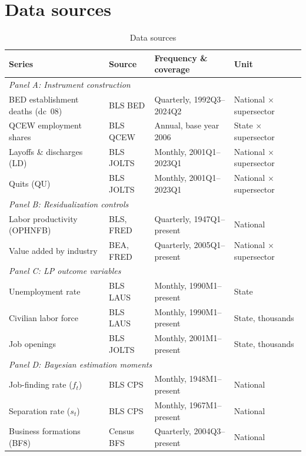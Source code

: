 \documentclass[authoryear, review, 12pt]{elsarticle}
\begin{document}
	\section{Data sources}\label{app:data_sources}

	\begin{table}[H]
	\centering\footnotesize
	\caption{Data sources\label{tab:data_sources}}
	\begin{tabular}{@{}p{3.8cm}p{2.4cm}p{4.2cm}p{3.2cm}@{}}
		\toprule
		Series & Source & Frequency \& coverage & Unit \\
		\midrule
		\multicolumn{4}{l}{\textit{Panel A: Instrument construction}} \\[2pt]
		BED establishment deaths (dc~08) & BLS BED   & Quarterly, 1992Q3--2024Q2  & National $\times$ supersector \\[2pt]
		QCEW employment shares           & BLS QCEW  & Annual, base year 2006     & State $\times$ supersector    \\[2pt]
		Layoffs \& discharges (LD)        & BLS JOLTS & Monthly, 2001Q1--2023Q1    & National $\times$ supersector \\[2pt]
		Quits (QU)                       & BLS JOLTS & Monthly, 2001Q1--2023Q1    & National $\times$ supersector \\[5pt]
		\multicolumn{4}{l}{\textit{Panel B: Residualization controls}} \\[2pt]
		Labor productivity (OPHNFB)      & BLS, FRED & Quarterly, 1947Q1--present & National                      \\[2pt]
		Value added by industry          & BEA, FRED & Quarterly, 2005Q1--present & National $\times$ supersector \\[5pt]
		\multicolumn{4}{l}{\textit{Panel C: LP outcome variables}} \\[2pt]
		Unemployment rate                & BLS LAUS  & Monthly, 1990M1--present   & State                         \\[2pt]
		Civilian labor force             & BLS LAUS  & Monthly, 1990M1--present   & State, thousands              \\[2pt]
		Job openings                     & BLS JOLTS & Monthly, 2001M1--present   & State, thousands              \\[5pt]
		\multicolumn{4}{l}{\textit{Panel D: Bayesian estimation moments}} \\[2pt]
		Job-finding rate ($f_t$)         & BLS CPS   & Monthly, 1948M1--present   & National                      \\[2pt]
		Separation rate ($s_t$)          & BLS CPS   & Monthly, 1967M1--present   & National                      \\[2pt]
		Business formations (BF8)        & Census BFS & Quarterly, 2004Q3--present & National                     \\[2pt]
		\bottomrule
	\end{tabular}
	\end{table}
\end{document}
